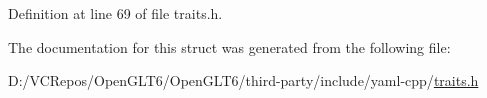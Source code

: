 Definition at line 69 of file traits.\+h.



The documentation for this struct was generated from the following file\+:\begin{DoxyCompactItemize}
\item 
D\+:/\+V\+C\+Repos/\+Open\+G\+L\+T6/\+Open\+G\+L\+T6/third-\/party/include/yaml-\/cpp/\mbox{\hyperlink{traits_8h}{traits.\+h}}\end{DoxyCompactItemize}
